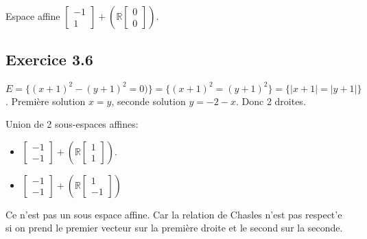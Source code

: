 \documentclass[]{book}
\theoremstyle{definition}
\newcommand{\bb}[1]{\mathbb{#1}}
\newcommand{\R}{\bb{R}}
\begin{document}
Espace affine $\begin{bmatrix} -1 \\ 1 \end{bmatrix} + (\R \begin{bmatrix} 0 \\ 0 \end{bmatrix})$.

\subsection*{Exercice 3.6}
$E= \{ (x+1)^2 - (y+1)^2 = 0)\} = \{ (x+1)^2 = (y+1)^2\} = \{ |x+1| = |y+1| \}$. Premi\`ere solution $x=y$, seconde solution $y = -2-x$. Donc 2 droites.


Union de 2 sous-espaces affines:
\begin{itemize}
    \item $\begin{bmatrix} -1 \\ -1 \end{bmatrix} + (\R \begin{bmatrix} 1 \\ 1 \end{bmatrix})$.
    \item $\begin{bmatrix} -1 \\ -1 \end{bmatrix} + (\R \begin{bmatrix} 1 \\ -1 \end{bmatrix})$
\end{itemize}
Ce n'est pas un sous espace affine. Car la relation de Chasles n'est pas respect'e si on prend le premier vecteur sur la premi\`ere droite et le second sur la seconde.
\end{document}
